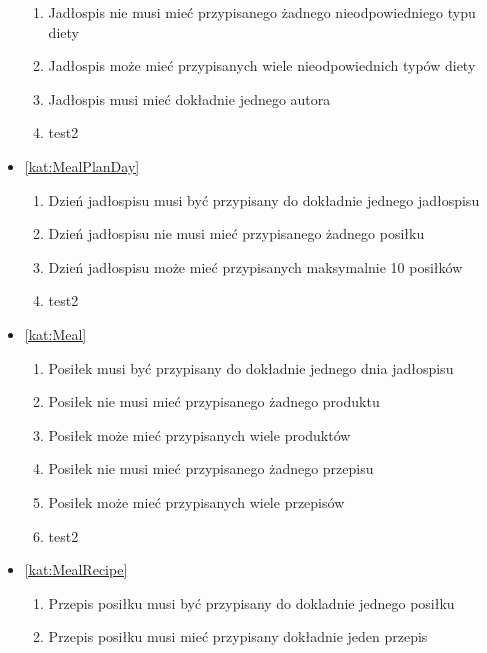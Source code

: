 \begin{itemize}[label={\textbf{Reguły dla}}, wide, labelwidth=!, labelindent=0pt]
\begin{enumerate}[label={\textbf{REG/\protect\threedigits{\arabic{enumi}}}}, wide, labelwidth=!, align=left, leftmargin=3cm, resume]
        \item Jadłospis nie musi mieć przypisanego żadnego nieodpowiedniego typu diety
        \item Jadłospis może mieć przypisanych wiele nieodpowiednich typów diety
        \item Jadłospis musi mieć dokładnie jednego autora
        \item test2
    \end{enumerate}
    \item\ref{kat:MealPlanDay}
    \begin{enumerate}[label={\textbf{REG/\protect\threedigits{\arabic{enumi}}}}, wide, labelwidth=!, align=left, leftmargin=3cm, resume]
        \item Dzień jadłospisu musi być przypisany do dokładnie jednego jadłospisu
        \item Dzień jadłospisu nie musi mieć przypisanego żadnego posiłku
        \item Dzień jadłospisu może mieć przypisanych maksymalnie 10 posiłków
        \item test2
    \end{enumerate}
    \item\ref{kat:Meal}
    \begin{enumerate}[label={\textbf{REG/\protect\threedigits{\arabic{enumi}}}}, wide, labelwidth=!, align=left, leftmargin=3cm, resume]
        \item Posiłek musi być przypisany do dokładnie jednego dnia jadłospisu
        \item Posiłek nie musi mieć przypisanego żadnego produktu
        \item Posiłek może mieć przypisanych wiele produktów
        \item Posiłek nie musi mieć przypisanego żadnego przepisu
        \item Posiłek może mieć przypisanych wiele przepisów
        \item test2
    \end{enumerate}
    \item\ref{kat:MealRecipe}
    \begin{enumerate}[label={\textbf{REG/\protect\threedigits{\arabic{enumi}}}}, wide, labelwidth=!, align=left, leftmargin=3cm, resume]
        \item Przepis posiłku musi być przypisany do dokladnie jednego posiłku
        \item Przepis posiłku musi mieć przypisany dokładnie jeden przepis

\end{enumerate}
\end{itemize}
